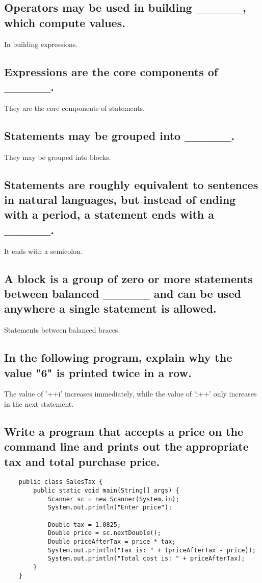 \documentclass{article}
\begin{document}
    \subsection{Operators may be used in building \_\_\_\_\_, which compute values.}
    In building expressions.

    \subsection{Expressions are the core components of \_\_\_\_\_.}
    They are the core components of statements.

    \subsection{Statements may be grouped into \_\_\_\_\_.}
    They may be grouped into blocks.

    \subsection{Statements are roughly equivalent to sentences in natural languages, but instead of ending with a period, a statement ends with a \_\_\_\_\_.}
    It ends with a semicolon.

    \subsection{A block is a group of zero or more statements between balanced \_\_\_\_\_ and can be used anywhere a single statement is allowed.}
    Statements between balanced braces.

    \subsection{In the following program, explain why the value "6" is printed twice in a row.}
    The value of '++i' increases immediately, while the value of 'i++' only increases in the next statement.

    \newpage
    \subsection{Write a program that accepts a price on the command line and prints out the appropriate tax and total purchase price.}

    \begin{verbatim}
    public class SalesTax {
        public static void main(String[] args) {
            Scanner sc = new Scanner(System.in);
            System.out.println("Enter price");
            
            Double tax = 1.0825;
            Double price = sc.nextDouble();
            Double priceAfterTax = price * tax;
            System.out.println("Tax is: " + (priceAfterTax - price));
            System.out.println("Total cost is: " + priceAfterTax);
        }
    }
    \end{verbatim}
\end{document}
